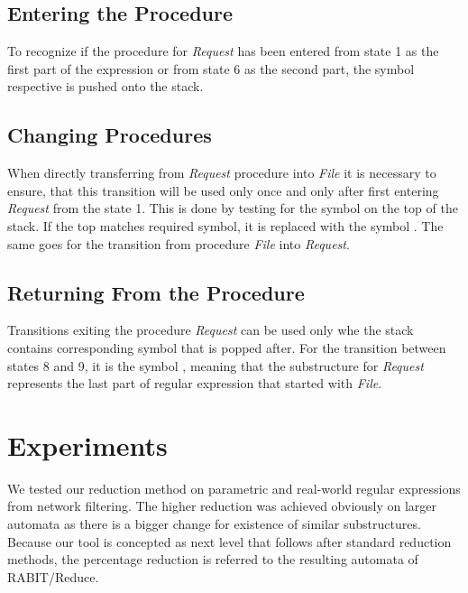 \documentclass{ExcelAtFIT}
\newcommand{\circledtext}[2][red]{%
    \tikz[baseline=(char.base)]{
        \node[shape=circle, draw, fill=#1, inner sep=0pt] (char) {\hspace*{0.15mm}\textbf{\textcolor{#1}{#2}}};}\hspace*{-1mm}
}
\begin{document}
	\subsection*{Entering the Procedure}
		To recognize if the procedure for \textit{Request} has been entered from state 1 as the first part of the expression or from state 6 as the second part, the symbol \circledtext[orange]{1} respective \circledtext[black!20!green]{6} is pushed onto the stack.

	\subsection*{Changing Procedures}
		When directly transferring from \textit{Request} procedure into \textit{File} it is necessary to ensure, that this transition will be used only once and only after first entering \textit{Request} from the state 1. This is done by testing for the symbol \circledtext[orange]{1} on the top of the stack. If the top matches required symbol, it is replaced with the symbol \circledtext[white!20!red]{5}. The same goes for the transition from procedure \textit{File} into \textit{Request}.

	\subsection*{Returning From the Procedure}
		Transitions exiting the procedure \textit{Request} can be used only whe the stack contains corresponding symbol that is popped after. For the transition between states 8 and 9, it is the symbol \circledtext[black!20!green]{6}, meaning that the substructure for \textit{Request} represents the last part of regular expression that started with \textit{File}.


\section{Experiments}
	We tested our reduction method on parametric and real-world regular expressions from network filtering. The higher reduction was achieved obviously on larger automata as there is a bigger change for existence of similar substructures. Because our tool is concepted as next level that follows after standard reduction methods, the percentage reduction is referred to the resulting automata of RABIT/Reduce.
\end{document}

